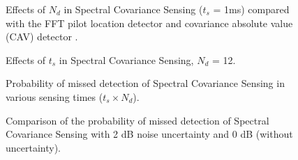 \documentclass[draftclsnofoot,onecolumn,12pt]{IEEEtran}
\begin{document}
\begin{figure}[p]
  \centering
{}
  \caption{Effects of $N_d$ in Spectral Covariance Sensing ($t_s$ = 1ms) compared with the FFT pilot location detector \cite{CorGho07} and covariance absolute value (CAV) detector \cite{ZenLia09}.} \label{fig:SCS_Nd_ts1_rho0}
\end{figure}

\begin{figure}[p]
  \centering
{}
  \caption{Effects of $t_s$ in Spectral Covariance Sensing, $N_d$ = 12.} \label{fig:SCS_ts_Nd30_rho0}
\end{figure}


\begin{figure}[p]
  \centering
{}
  \caption{Probability of missed detection of Spectral Covariance Sensing in various sensing times ($t_s \times N_d$).} \label{fig:SCS_tsxNd_rho0}
\end{figure}

\begin{figure}[p]
  \centering
{}
  \caption{Comparison of the probability of missed detection of Spectral Covariance Sensing with 2 dB noise uncertainty and 0 dB (without uncertainty).} \label{fig:SCS_rho0vs2}
\end{figure}
\end{document}

